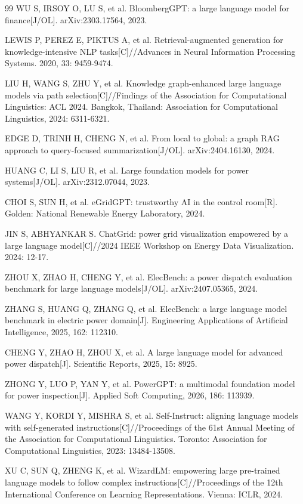 \documentclass[fontset=fandol,type=master,campus=shenzhen,etitleauto=true]{hithesisbook}
\begin{document}
\begin{thebibliography}{99}
 WU S, IRSOY O, LU S, et al. BloombergGPT: a large language model for finance[J/OL]. arXiv:2303.17564, 2023.

 LEWIS P, PEREZ E, PIKTUS A, et al. Retrieval-augmented generation for knowledge-intensive NLP tasks[C]//Advances in Neural Information Processing Systems. 2020, 33: 9459-9474.

 LIU H, WANG S, ZHU Y, et al. Knowledge graph-enhanced large language models via path selection[C]//Findings of the Association for Computational Linguistics: ACL 2024. Bangkok, Thailand: Association for Computational Linguistics, 2024: 6311-6321.

 EDGE D, TRINH H, CHENG N, et al. From local to global: a graph RAG approach to query-focused summarization[J/OL]. arXiv:2404.16130, 2024.

 HUANG C, LI S, LIU R, et al. Large foundation models for power systems[J/OL]. arXiv:2312.07044, 2023.

 CHOI S, SUN H, et al. eGridGPT: trustworthy AI in the control room[R]. Golden: National Renewable Energy Laboratory, 2024.

 JIN S, ABHYANKAR S. ChatGrid: power grid visualization empowered by a large language model[C]//2024 IEEE Workshop on Energy Data Visualization. 2024: 12-17.

 ZHOU X, ZHAO H, CHENG Y, et al. ElecBench: a power dispatch evaluation benchmark for large language models[J/OL]. arXiv:2407.05365, 2024.

 ZHANG S, HUANG Q, ZHANG Q, et al. ElecBench: a large language model benchmark in electric power domain[J]. Engineering Applications of Artificial Intelligence, 2025, 162: 112310.

 CHENG Y, ZHAO H, ZHOU X, et al. A large language model for advanced power dispatch[J]. Scientific Reports, 2025, 15: 8925.

 ZHONG Y, LUO P, YAN Y, et al. PowerGPT: a multimodal foundation model for power inspection[J]. Applied Soft Computing, 2026, 186: 113939.

 WANG Y, KORDI Y, MISHRA S, et al. Self-Instruct: aligning language models with self-generated instructions[C]//Proceedings of the 61st Annual Meeting of the Association for Computational Linguistics. Toronto: Association for Computational Linguistics, 2023: 13484-13508.

 XU C, SUN Q, ZHENG K, et al. WizardLM: empowering large pre-trained language models to follow complex instructions[C]//Proceedings of the 12th International Conference on Learning Representations. Vienna: ICLR, 2024.


\end{thebibliography}
\end{document}
